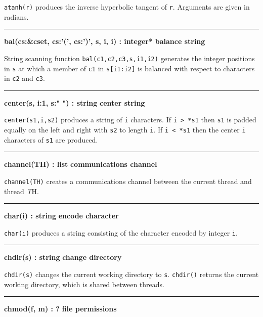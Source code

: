 \noindent
{}\texttt{atanh(r)} produces the inverse
hyperbolic tangent of \texttt{r}. Arguments are given in radians.

\bigskip
\hrule\vspace{0.1cm}
\noindent
{\bf bal(cs:\&cset, cs:'(', cs:')', s, i, i) : integer* } \hfill {\bf balance string}

\noindent
{}String scanning function
\texttt{bal(c1,c2,c3,s,i1,i2)} generates the integer positions in
\texttt{s} at which a member of \texttt{c1} in \texttt{s[i1:i2]} is
balanced with respect to characters in \texttt{c2} and \texttt{c3}.

\bigskip
\hrule\vspace{0.1cm}
\noindent
{\bf center(s, i:1, s:" ") : string } \hfill {\bf center string}

\noindent
{}\texttt{center(s1,i,s2)} produces a
string of \texttt{i} characters. If \texttt{i {\textgreater} *s1} then
\texttt{s1} is padded equally on the left and right with \texttt{s2} to
length \texttt{i}. If \texttt{i {\textless} *s1} then the center
\texttt{i} characters of \texttt{s1} are produced.

\bigskip
\hrule\vspace{0.1cm}
\noindent
{\bf channel(TH) : list } \hfill {\bf communications channel}

\noindent
{}\texttt{channel(TH)} creates a communications channel
between the current thread and thread {\textit TH}.

\bigskip
\hrule\vspace{0.1cm}
\noindent
{\bf char(i) : string } \hfill {\bf encode character}

\noindent
{}\texttt{char(i)} produces a string consisting of the
character encoded by integer \texttt{i}.

\bigskip
\hrule\vspace{0.1cm}
\noindent
{\bf chdir(s) : string } \hfill {\bf change directory}\WarningNotThreadSafe

\noindent
{}\texttt{chdir(s)} changes the current
working directory to \texttt{s}. \texttt{chdir()} returns the current
working directory, which is shared between threads.


\bigskip
\hrule\vspace{0.1cm}
\noindent
{\bf chmod(f, m) : ? } \hfill {\bf file permissions}

